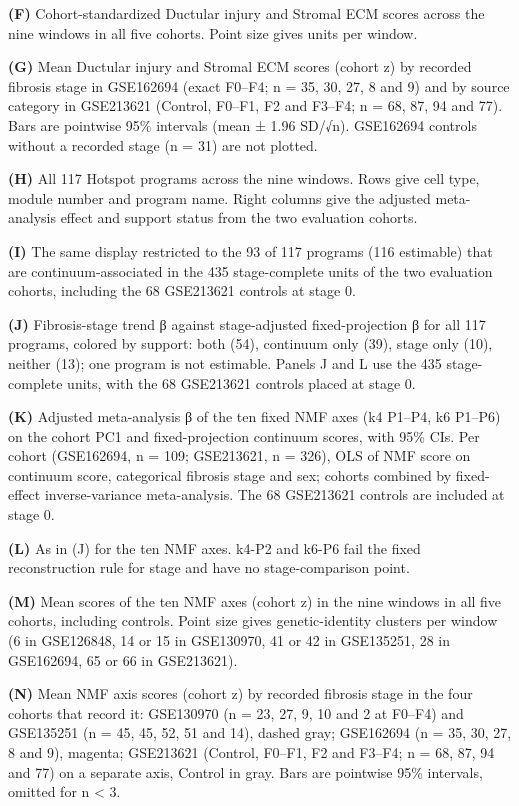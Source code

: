 \textbf{(F)} Cohort-standardized Ductular injury and Stromal ECM scores across the nine windows in all five cohorts. Point size gives units per window.

\textbf{(G)} Mean Ductular injury and Stromal ECM scores (cohort z) by recorded fibrosis stage in GSE162694 (exact F0--F4; n = 35, 30, 27, 8 and 9) and by source category in GSE213621 (Control, F0--F1, F2 and F3--F4; n = 68, 87, 94 and 77). Bars are pointwise 95\% intervals (mean ± 1.96 SD/√n). GSE162694 controls without a recorded stage (n = 31) are not plotted.

\textbf{(H)} All 117 Hotspot programs across the nine windows. Rows give cell type, module number and program name. Right columns give the adjusted meta-analysis effect and support status from the two evaluation cohorts.

\textbf{(I)} The same display restricted to the 93 of 117 programs (116 estimable) that are continuum-associated in the 435 stage-complete units of the two evaluation cohorts, including the 68 GSE213621 controls at stage 0.

\textbf{(J)} Fibrosis-stage trend β against stage-adjusted fixed-projection β for all 117 programs, colored by support: both (54), continuum only (39), stage only (10), neither (13); one program is not estimable. Panels J and L use the 435 stage-complete units, with the 68 GSE213621 controls placed at stage 0.

\textbf{(K)} Adjusted meta-analysis β of the ten fixed NMF axes (k4 P1--P4, k6 P1--P6) on the cohort PC1 and fixed-projection continuum scores, with 95\% CIs. Per cohort (GSE162694, n = 109; GSE213621, n = 326), OLS of NMF score on continuum score, categorical fibrosis stage and sex; cohorts combined by fixed-effect inverse-variance meta-analysis. The 68 GSE213621 controls are included at stage 0.

\textbf{(L)} As in (J) for the ten NMF axes. k4-P2 and k6-P6 fail the fixed reconstruction rule for stage and have no stage-comparison point.

\textbf{(M)} Mean scores of the ten NMF axes (cohort z) in the nine windows in all five cohorts, including controls. Point size gives genetic-identity clusters per window (6 in GSE126848, 14 or 15 in GSE130970, 41 or 42 in GSE135251, 28 in GSE162694, 65 or 66 in GSE213621).

\textbf{(N)} Mean NMF axis scores (cohort z) by recorded fibrosis stage in the four cohorts that record it: GSE130970 (n = 23, 27, 9, 10 and 2 at F0--F4) and GSE135251 (n = 45, 45, 52, 51 and 14), dashed gray; GSE162694 (n = 35, 30, 27, 8 and 9), magenta; GSE213621 (Control, F0--F1, F2 and F3--F4; n = 68, 87, 94 and 77) on a separate axis, Control in gray. Bars are pointwise 95\% intervals, omitted for n \textless{} 3.

